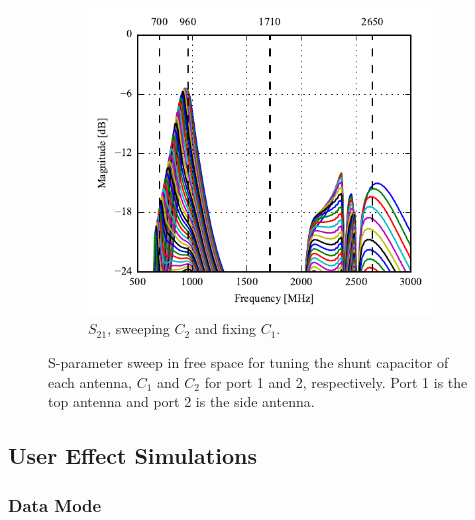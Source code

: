 \begin{figure}[htbp]
\begin{subfigure}[b]{0.49\linewidth}
    \end{subfigure}
    \hfill
    \begin{subfigure}[b]{0.49\linewidth}
        \centering
        \includegraphics{img/tech_sol/monopole/highband/sim/s22_s21.pdf}
        \caption{$S_{21}$, sweeping $C_2$ and fixing $C_1$.}
    \end{subfigure}
    \caption{S-parameter sweep in free space for tuning the shunt capacitor of each antenna, $C_1$ and $C_2$ for port 1 and 2, respectively. Port 1 is the top antenna and port 2 is the side antenna.}
    \label{fig:sparam_mono_modi_sim}
\end{figure}

\FloatBarrier
\subsection{User Effect Simulations}

\FloatBarrier
\subsubsection{Data Mode}

